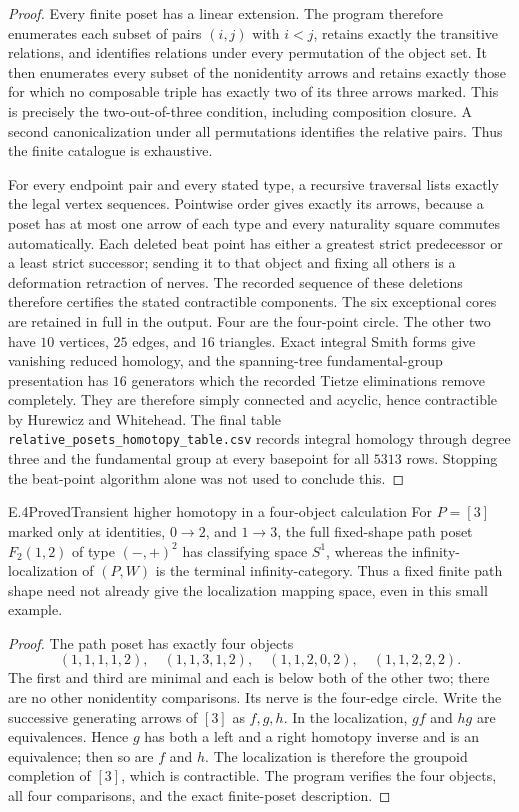 \begin{proof}
Every finite poset has a linear extension. The program therefore enumerates each subset of pairs $(i,j)$ with $i<j$, retains exactly the transitive relations, and identifies relations under every permutation of the object set. It then enumerates every subset of the nonidentity arrows and retains exactly those for which no composable triple has exactly two of its three arrows marked. This is precisely the two-out-of-three condition, including composition closure. A second canonicalization under all permutations identifies the relative pairs. Thus the finite catalogue is exhaustive.

For every endpoint pair and every stated type, a recursive traversal lists exactly the legal vertex sequences. Pointwise order gives exactly its arrows, because a poset has at most one arrow of each type and every naturality square commutes automatically. Each deleted beat point has either a greatest strict predecessor or a least strict successor; sending it to that object and fixing all others is a deformation retraction of nerves. The recorded sequence of these deletions therefore certifies the stated contractible components. The six exceptional cores are retained in full in the output. Four are the four-point circle. The other two have $10$ vertices, $25$ edges, and $16$ triangles. Exact integral Smith forms give vanishing reduced homology, and the spanning-tree fundamental-group presentation has $16$ generators which the recorded Tietze eliminations remove completely. They are therefore simply connected and acyclic, hence contractible by Hurewicz and Whitehead. The final table \texttt{relative\_posets\_homotopy\_table.csv} records integral homology through degree three and the fundamental group at every basepoint for all $5313$ rows. Stopping the beat-point algorithm alone was not used to conclude this.
\end{proof}

\begin{result}{E.4}{Proved}{Transient higher homotopy in a four-object calculation}
For $P=[3]$ marked only at identities, $0\to2$, and $1\to3$, the full fixed-shape path poset $F_2(1,2)$ of type $(-,+)^2$ has classifying space $S^1$, whereas the infinity-localization of $(P,W)$ is the terminal infinity-category. Thus a fixed finite path shape need not already give the localization mapping space, even in this small example.
\end{result}
\begin{proof}
The path poset has exactly four objects
\[
 (1,1,1,1,2),\quad(1,1,3,1,2),\quad
 (1,1,2,0,2),\quad(1,1,2,2,2).
\]
The first and third are minimal and each is below both of the other two; there are no other nonidentity comparisons. Its nerve is the four-edge circle. Write the successive generating arrows of $[3]$ as $f,g,h$. In the localization, $gf$ and $hg$ are equivalences. Hence $g$ has both a left and a right homotopy inverse and is an equivalence; then so are $f$ and $h$. The localization is therefore the groupoid completion of $[3]$, which is contractible. The program verifies the four objects, all four comparisons, and the exact finite-poset description.
\end{proof}

